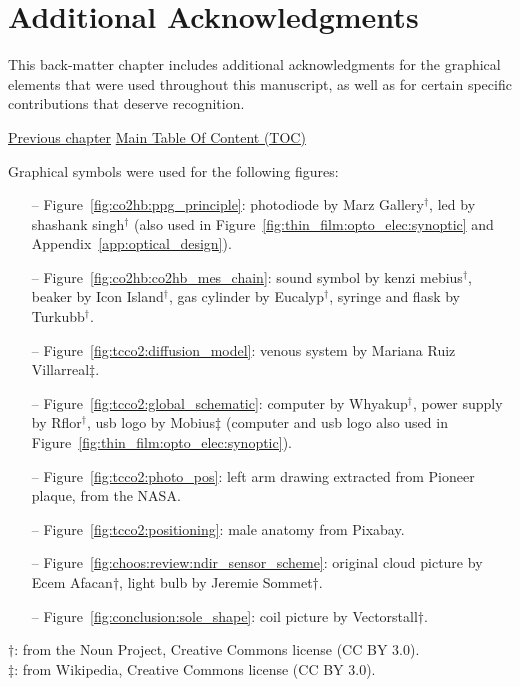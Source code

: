 \chapter{Additional Acknowledgments}\label{chap:add_ack}

\begin{tldrbox}
	This back-matter chapter includes additional acknowledgments for the graphical elements that were used throughout this manuscript, as well as for certain specific contributions that deserve recognition.
	
	\tcblower
	
	\hyperref[chap:biblio]{Previous chapter} \hfill \hyperref[chapter:toc]{Main Table Of Content (TOC)} \hfill \hphantom{Next chapter}
	
\end{tldrbox}

Graphical symbols were used for the following figures:

\begin{itemize}
	\item[--] Figure~\ref{fig:co2hb:ppg_principle}: photodiode by Marz Gallery$^\dagger$, \gls{led} by shashank singh$^\dagger$ (also used in Figure~\ref{fig:thin_film:opto_elec:synoptic} and Appendix~\ref{app:optical_design}).
	\item[--] Figure~\ref{fig:co2hb:co2hb_mes_chain}: sound symbol by kenzi mebius$^\dagger$, beaker by Icon Island$^\dagger$, gas cylinder by Eucalyp$^\dagger$, syringe and flask by Turkubb$^\dagger$.
	\item[--] Figure~\ref{fig:tcco2:diffusion_model}: venous system by Mariana Ruiz Villarreal$\ddagger$.
	\item[--] Figure~\ref{fig:tcco2:global_schematic}: computer by Whyakup$^\dagger$, power supply by Rflor$^\dagger$, \gls{usb} logo by Mobius$\ddagger$ (computer and \gls{usb} logo also used in Figure~\ref{fig:thin_film:opto_elec:synoptic}).
	\item[--] Figure~\ref{fig:tcco2:photo_pos}: left arm drawing extracted from Pioneer plaque, from the NASA.
	\item[--] Figure~\ref{fig:tcco2:positioning}: male anatomy from Pixabay.
	\item[--] Figure~\ref{fig:choos:review:ndir_sensor_scheme}: original cloud picture by Ecem Afacan$\dagger$, light bulb by Jeremie Sommet$\dagger$.
	\item[--] Figure~\ref{fig:conclusion:sole_shape}: coil picture by Vectorstall$\dagger$.
\end{itemize}
$\dagger$: from the Noun Project, Creative Commons license (CC BY 3.0).\\$\ddagger$: from Wikipedia, Creative Commons license (CC BY 3.0).

